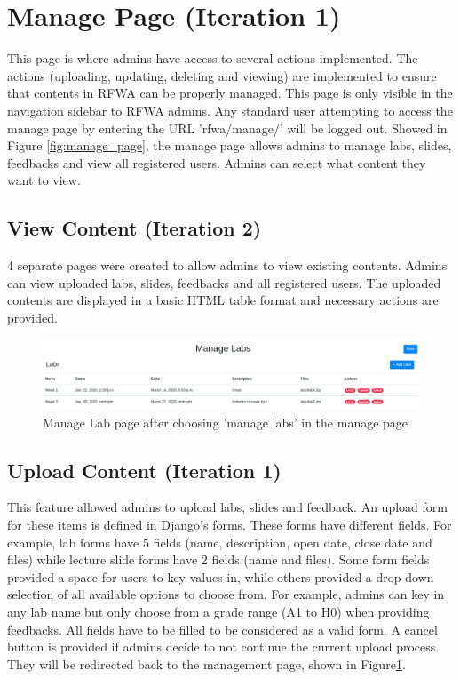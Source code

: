 \documentclass{l4proj}
\begin{document}
\section{Manage Page (Iteration 1)}

This page is where admins have access to several actions implemented. The actions (uploading, updating, deleting and viewing) are implemented to ensure that contents in RFWA can be properly managed. This page is only visible in the navigation sidebar to RFWA admins. Any standard user attempting to access the manage page by entering the URL 'rfwa/manage/' will be logged out. Showed in Figure \ref{fig:manage_page}, the manage page allows admins to manage labs, slides, feedbacks and view all registered users. Admins can select what content they want to view.

\subsection{View Content (Iteration 2)}

4 separate pages were created to allow admins to view existing contents. Admins can view uploaded labs, slides, feedbacks and all registered users. The uploaded contents are displayed in a basic HTML table format and necessary actions are provided.

\begin{figure}[h]
    \centering
    \includegraphics[scale=0.22]{images/manage_labs.png}
    \caption{Manage Lab page after choosing 'manage labs' in the manage page}
    \label{fig:manage_content}
\end{figure}

\subsection{Upload Content (Iteration 1)}

This feature allowed admins to upload labs, slides and feedback. An upload form for these items is defined in Django's forms. These forms have different fields. For example, lab forms have 5 fields (name, description, open date, close date and files) while lecture slide forms have 2 fields (name and files). Some form fields provided a space for users to key values in, while others provided a drop-down selection of all available options to choose from. For example, admins can key in any lab name but only choose from a grade range (A1 to H0) when providing feedbacks. All fields have to be filled to be considered as a valid form. A cancel button is provided if admins decide to not continue the current upload process. They will be redirected back to the management page, shown in Figure\ref{fig:manage_content}. 
\end{document}
